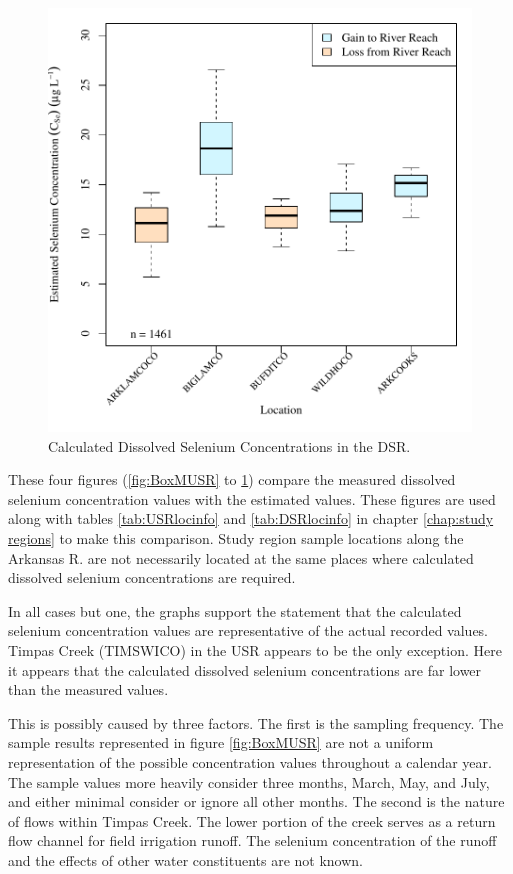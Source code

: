 \begin{linenumbers}
\begin{figure}[htbp]
\centering
	\includegraphics[width=6in]{"Figures/Results_DSR/Stochastic/c BOX Estimated CSe"}
	\caption[Calculated Dissolved Selenium Concentrations in the DSR.]{Calculated Dissolved Selenium Concentrations in the DSR.}
	\label{fig:BoxCDSR}
\end{figure}
These four figures (\ref{fig:BoxMUSR} to \ref{fig:BoxCDSR}) compare the measured dissolved selenium concentration values with the estimated values.  These figures are used along with tables \ref{tab:USRlocinfo} and \ref{tab:DSRlocinfo} in chapter \ref{chap:study regions} to make this comparison.  Study region sample locations along the Arkansas R. are not necessarily located at the same places where calculated dissolved selenium concentrations are required.

In all cases but one, the graphs support the statement that the calculated selenium concentration values are representative of the actual recorded values.  Timpas Creek (TIMSWICO) in the USR appears to be the only exception.  Here it appears that the calculated dissolved selenium concentrations are far lower than the measured values.  

This is possibly caused by three factors.  The first is the sampling frequency.  The sample results represented in figure \ref{fig:BoxMUSR} are not a uniform representation of the possible concentration values throughout a calendar year.  The sample values more heavily consider three months, March, May, and July, and either minimal consider or ignore all other months.  The second is the nature of flows within Timpas Creek.  The lower portion of the creek serves as a return flow channel for field irrigation runoff.  The selenium concentration of the runoff and the effects of other water constituents are not known.  


\end{linenumbers}
